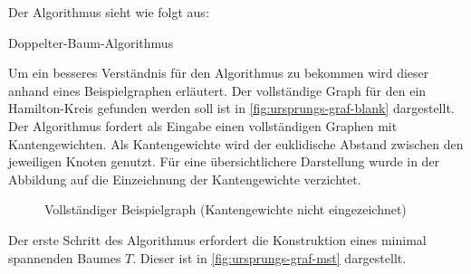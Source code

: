\documentclass{article}
\begin{document}
Der Algorithmus sieht wie folgt aus:

\begin{algorithm}
\caption{Doppelter-Baum-Algorithmus}
\end{algorithm}

Um ein besseres Verständnis für den Algorithmus zu bekommen wird dieser anhand eines Beispielgraphen erläutert. Der vollständige Graph für den ein Hamilton-Kreis gefunden werden soll ist in \autoref{fig:ursprungs-graf-blank} dargestellt. Der Algorithmus fordert als Eingabe einen vollständigen Graphen mit Kantengewichten. Als Kantengewichte wird der euklidische Abstand zwischen den jeweiligen Knoten genutzt. Für eine übersichtlichere Darstellung wurde in der Abbildung auf die Einzeichnung der Kantengewichte verzichtet.

\begin{figure}[H]
\centering
{}
\caption{Vollständiger Beispielgraph (Kantengewichte nicht eingezeichnet)}
\label{fig:ursprungs-graf-blank}
\end{figure}

Der erste Schritt des Algorithmus erfordert die Konstruktion eines minimal spannenden Baumes $T$. Dieser ist in \autoref{fig:ursprungs-graf-mst} dargestellt.
\end{document}
